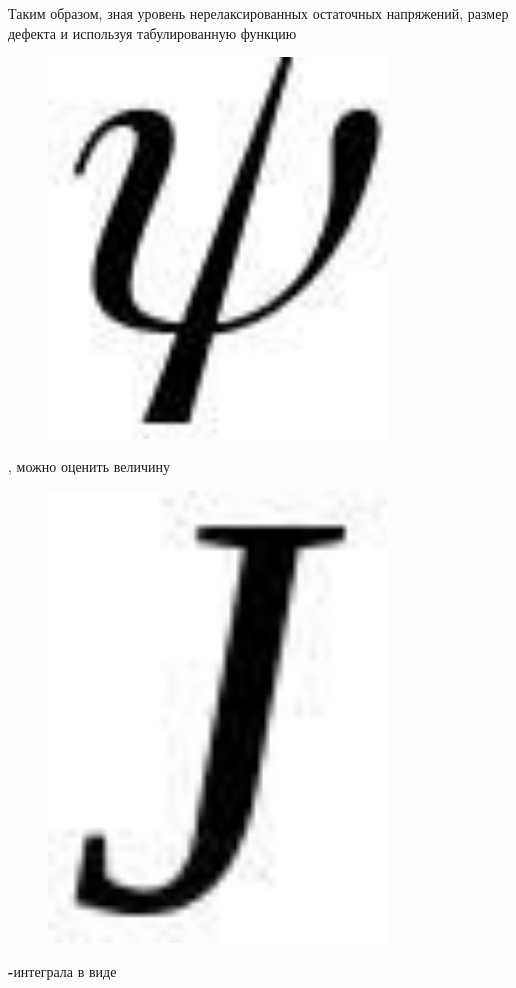 Таким образом, зная уровень нерелаксированных остаточных напряжений,
размер дефекта и используя табулированную функцию
\begin{figure}[H]
	\centering
	\includegraphics[width=0.8\textwidth]{assets/1242}
	\caption*{}
\end{figure}, можно оценить величину
\begin{figure}[H]
	\centering
	\includegraphics[width=0.8\textwidth]{assets/1243}
	\caption*{}
\end{figure}{\bfseries -}интеграла в виде

